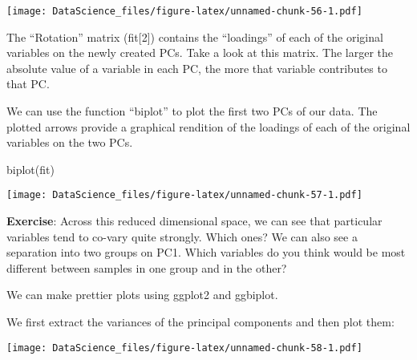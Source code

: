 \documentclass[
]{book}
\newenvironment{Shaded}{\begin{snugshade}}{\end{snugshade}}
\newcommand{\AttributeTok}[1]{\textcolor[rgb]{0.77,0.63,0.00}{#1}}
\newcommand{\DecValTok}[1]{\textcolor[rgb]{0.00,0.00,0.81}{#1}}
\newcommand{\FunctionTok}[1]{\textcolor[rgb]{0.00,0.00,0.00}{#1}}
\newcommand{\NormalTok}[1]{#1}
\newcommand{\OtherTok}[1]{\textcolor[rgb]{0.56,0.35,0.01}{#1}}
\newcommand{\SpecialCharTok}[1]{\textcolor[rgb]{0.00,0.00,0.00}{#1}}
\newcommand{\StringTok}[1]{\textcolor[rgb]{0.31,0.60,0.02}{#1}}
\begin{document}
\texttt{[image: DataScience\_files/figure-latex/unnamed-chunk-56-1.pdf]}

The ``Rotation'' matrix (fit{[}2{]}) contains the ``loadings'' of each of the original variables on the newly created PCs. Take a look at this matrix. The larger the absolute value of a variable in each PC, the more that variable contributes to that PC.

We can use the function ``biplot'' to plot the first two PCs of our data. The plotted arrows provide a graphical rendition of the loadings of each of the original variables on the two PCs.

\begin{Shaded}
\begin{Highlighting}[]
\FunctionTok{biplot}\NormalTok{(fit)}
\end{Highlighting}
\end{Shaded}

\texttt{[image: DataScience\_files/figure-latex/unnamed-chunk-57-1.pdf]}

\textbf{Exercise}: Across this reduced dimensional space, we can see that particular variables tend to co-vary quite strongly. Which ones? We can also see a separation into two groups on PC1. Which variables do you think would be most different between samples in one group and in the other?

We can make prettier plots using ggplot2 and ggbiplot.

We first extract the variances of the principal components and then plot them:

\begin{Shaded}
\end{Shaded}

\texttt{[image: DataScience\_files/figure-latex/unnamed-chunk-58-1.pdf]}
\end{document}
